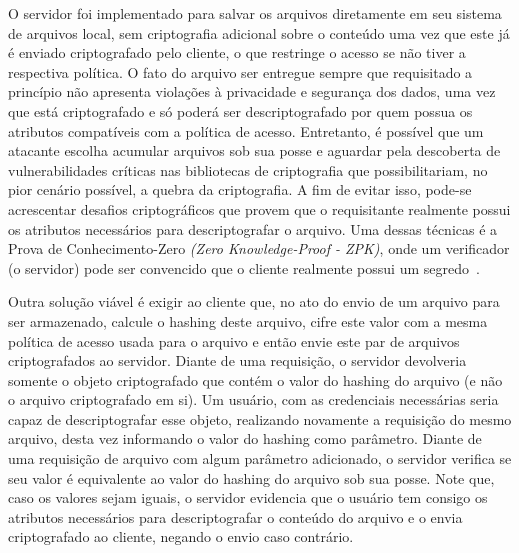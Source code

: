 \documentclass[a4paper,11pt]{article}
\begin{document}
O servidor foi implementado para salvar os arquivos diretamente em seu sistema de arquivos local, sem criptografia adicional sobre o conteúdo uma vez que este já é enviado criptografado pelo cliente, o que restringe o acesso se não tiver a respectiva política.
O fato do arquivo ser entregue sempre que requisitado a princípio não apresenta violações à privacidade e segurança dos dados, uma vez que está criptografado e só poderá ser descriptografado por quem possua os atributos compatíveis com a política de acesso.
Entretanto, é possível que um atacante escolha acumular arquivos sob sua posse e aguardar pela descoberta de vulnerabilidades críticas nas bibliotecas de criptografia que possibilitariam, no pior cenário possível, a quebra da criptografia.
A fim de evitar isso, pode-se acrescentar desafios criptográficos que provem que o requisitante realmente possui os atributos necessários para descriptografar o arquivo.
Uma dessas técnicas é a Prova de Conhecimento-Zero \emph{(Zero Knowledge-Proof - ZPK)}, onde um verificador (o servidor) pode ser convencido que o cliente realmente possui um segredo~\cite{Rice2010,Buchanan2017}.


Outra solução viável é exigir ao cliente que, no ato do envio de um arquivo para ser armazenado, calcule o hashing deste arquivo, cifre este valor com a mesma política de acesso usada para o arquivo e então envie este par de arquivos criptografados ao servidor.
Diante de uma requisição, o servidor devolveria somente o objeto criptografado que contém o valor do hashing do arquivo (e não o arquivo criptografado em si).
Um usuário, com as credenciais necessárias seria capaz de descriptografar esse objeto, realizando novamente a requisição do mesmo arquivo, desta vez informando o valor do hashing como parâmetro.
Diante de uma requisição de arquivo com algum parâmetro adicionado, o servidor verifica se seu valor é equivalente ao valor do hashing do arquivo sob sua posse. Note que, caso os valores sejam iguais, o servidor evidencia que o usuário tem consigo os atributos necessários para descriptografar o conteúdo do arquivo e o envia criptografado ao cliente, negando o envio caso contrário.
\end{document}
